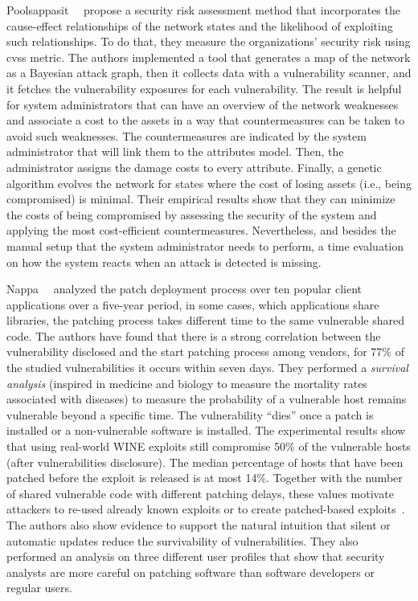 Poolsappasit~\etal{}~\cite{Poolsappasit:2012} propose a security risk assessment method that incorporates the cause-effect relationships of the network states and the likelihood of exploiting such relationships.
To do that, they measure the organizations' security risk using \gls{cvss} metric.
The authors implemented a tool that generates a map of the network as a Bayesian attack graph, then it collects data with a vulnerability scanner, and it fetches the vulnerability exposures for each vulnerability.
The result is helpful for system administrators that can have an overview of the network weaknesses and associate a cost to the assets in a way that countermeasures can be taken to avoid such weaknesses.
The countermeasures are indicated by the system administrator that will link them to the attributes model.
Then, the administrator assigns the damage costs to every attribute.
Finally, a genetic algorithm evolves the network for states where the cost of losing assets (i.e., being compromised) is minimal. 
Their empirical results show that they can minimize the costs of being compromised by assessing the security of the system and applying the most cost-efficient countermeasures.
Nevertheless, and besides the manual setup that the system administrator needs to perform, a time evaluation on how the system reacts when an attack is detected is missing.


Nappa~\etal{}~\cite{Nappa:2015} analyzed the patch deployment process over ten popular client applications over a five-year period, in some cases, which applications share libraries, the patching process takes different time to the same vulnerable shared code. 
The authors have found that there is a strong correlation between the vulnerability disclosed and the start patching process among vendors, for 77\% of the studied vulnerabilities it occurs within seven days. 
They performed a \emph{survival analysis} (inspired in medicine and biology to measure the mortality rates associated with diseases) to measure the probability of a vulnerable host remains vulnerable beyond a specific time.
The vulnerability ``dies'' once a patch is installed or a non-vulnerable software is installed.
The experimental results show that using real-world WINE exploits still compromise 50\% of the vulnerable hosts (after vulnerabilities disclosure). 
The median percentage of hosts that have been patched before the exploit is released is at most 14\%.
Together with the number of shared vulnerable code with different patching delays, these values motivate attackers to re-used already known exploits or to create patched-based exploits~\cite{Brumley:2008}.
The authors also show evidence to support the natural intuition that silent or automatic updates reduce the survivability of vulnerabilities. 
They also performed an analysis on three different user profiles that show that security analysts are more careful on patching software than software developers or regular users.


